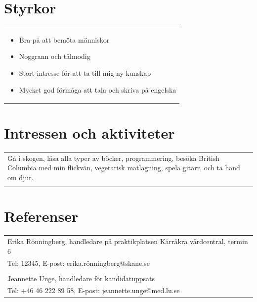 \documentclass[11pt,a4paper]{article}
\begin{document}
\section{Styrkor}
\begin{tabularx}{\textwidth}{X}
	\vspace{-7pt}
	\begin{itemize}[leftmargin=0.8em]
		\item Bra på att bemöta människor
		\item Noggrann och tålmodig
		\item Stort intresse för att ta till mig ny kunskap
		\item Mycket god förmåga att tala och skriva på engelska
	\end{itemize}
\end{tabularx}

\section{Intressen och aktiviteter}
\begin{tabularx}{\textwidth}{X}
Gå i skogen, läsa alla typer av böcker, programmering, besöka British Columbia med min flickvän, vegetarisk matlagning, spela gitarr, och ta hand om djur.\\
\\
\end{tabularx}


\section{Referenser}
\begin{tabularx}{\textwidth}{X}
Erika Rönningberg, handledare på praktikplatsen Kärråkra vårdcentral, termin 6 \\ Tel: 12345, E-post: erika.rönningberg@skane.se \\
\\
Jeannette Unge, handledare för kandidatuppsats\\ Tel: +46 46 222 89 58, E-post: jeannette.unge@med.lu.se \\
\end{tabularx}
\end{document}

